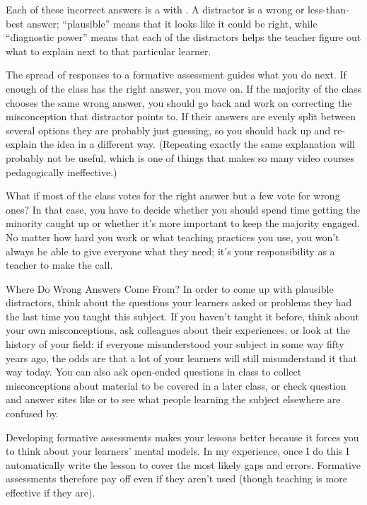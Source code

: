 Each of these incorrect answers is a 
with .
A distractor is a wrong or less-than-best answer;
``plausible'' means that it looks like it could be right,
while ``diagnostic power'' means that each of the distractors helps the teacher figure out
what to explain next to that particular learner.

The spread of responses to a formative assessment guides what you do next.
If enough of the class has the right answer, you move on.
If the majority of the class chooses the same wrong answer,
you should go back and work on correcting the misconception that distractor points to.
If their answers are evenly split between several options they are probably just guessing,
so you should back up and re-explain the idea in a different way.
(Repeating exactly the same explanation will probably not be useful,
which is one of things that makes so many video courses pedagogically ineffective.)

What if most of the class votes for the right answer
but a few vote for wrong ones?
In that case,
you have to decide whether you should spend time getting the minority caught up
or whether it's more important to keep the majority engaged.
No matter how hard you work or what teaching practices you use,
you won't always be able to give everyone what they need;
it's your responsibility as a teacher to make the call.

\begin{aside}{Where Do Wrong Answers Come From?}
  In order to come up with plausible distractors,
  think about the questions your learners asked or problems they had
  the last time you taught this subject.
  If you haven't taught it before,
  think about your own misconceptions,
  ask colleagues about their experiences,
  or look at the history of your field:
  if everyone misunderstood your subject in some way fifty years ago,
  the odds are that a lot of your learners will still misunderstand it that way today.
  You can also ask open-ended questions in class
  to collect misconceptions about material to be covered in a later class,
  or check question and answer sites like 
  or 
  to see what people learning the subject elsewhere are confused by.
\end{aside}

Developing formative assessments makes your lessons better
because it forces you to think about your learners' mental models.
In my experience,
once I do this I automatically write the lesson to cover the most likely gaps and errors.
Formative assessments therefore pay off even if they aren't used
(though teaching is more effective if they are).

